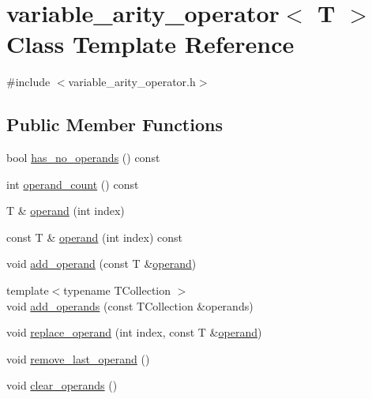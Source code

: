 \hypertarget{classvariable__arity__operator}{}\section{variable\+\_\+arity\+\_\+operator$<$ T $>$ Class Template Reference}
\label{classvariable__arity__operator}


{\ttfamily \#include $<$variable\+\_\+arity\+\_\+operator.\+h$>$}

\subsection*{Public Member Functions}
\begin{DoxyCompactItemize}
\item 
bool \mbox{\hyperlink{classvariable__arity__operator_a22780769430d4ff3d7ce4437e53e10eb}{has\+\_\+no\+\_\+operands}} () const
\item 
int \mbox{\hyperlink{classvariable__arity__operator_a8a174af98c61f22a922c9ddf1ff32434}{operand\+\_\+count}} () const
\item 
T \& \mbox{\hyperlink{classvariable__arity__operator_a14be99b3e0d7e0604aba35376be982cf}{operand}} (int index)
\item 
const T \& \mbox{\hyperlink{classvariable__arity__operator_a2267ce7b53012afcfab8bc0a68daa522}{operand}} (int index) const
\item 
void \mbox{\hyperlink{classvariable__arity__operator_a8ac51b2911c51f9cde1b8b8f8aa101b5}{add\+\_\+operand}} (const T \&\mbox{\hyperlink{classvariable__arity__operator_a14be99b3e0d7e0604aba35376be982cf}{operand}})
\item 
{\footnotesize template$<$typename T\+Collection $>$ }\\void \mbox{\hyperlink{classvariable__arity__operator_a0f78e9be6f6f0b1a1a1767e401f40ac0}{add\+\_\+operands}} (const T\+Collection \&operands)
\item 
void \mbox{\hyperlink{classvariable__arity__operator_ad222ead15955e3b74bae9e409c25b401}{replace\+\_\+operand}} (int index, const T \&\mbox{\hyperlink{classvariable__arity__operator_a14be99b3e0d7e0604aba35376be982cf}{operand}})
\item 
void \mbox{\hyperlink{classvariable__arity__operator_ac124c2f286a72e65b3fb81d92bf1b557}{remove\+\_\+last\+\_\+operand}} ()
\item 
void \mbox{\hyperlink{classvariable__arity__operator_a11b0559752155c5689d18c5ad91f8eec}{clear\+\_\+operands}} ()

\end{DoxyCompactItemize}
